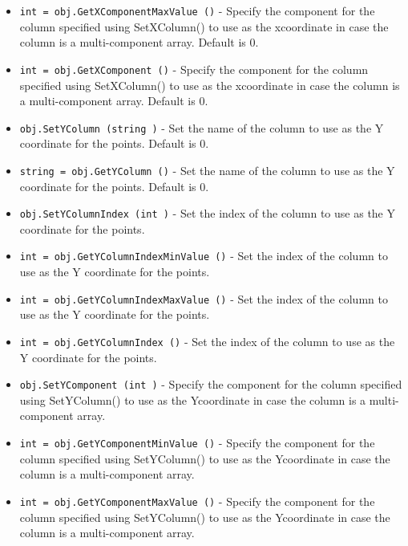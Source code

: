 \begin{itemize}
\item  \verb|int = obj.GetXComponentMaxValue ()| -  Specify the component for the column specified using SetXColumn() to
 use as the xcoordinate in case the column is a multi-component array.
 Default is 0.

\item  \verb|int = obj.GetXComponent ()| -  Specify the component for the column specified using SetXColumn() to
 use as the xcoordinate in case the column is a multi-component array.
 Default is 0.

\item  \verb|obj.SetYColumn (string )| -  Set the name of the column to use as the Y coordinate for the points. 
 Default is 0.

\item  \verb|string = obj.GetYColumn ()| -  Set the name of the column to use as the Y coordinate for the points. 
 Default is 0.

\item  \verb|obj.SetYColumnIndex (int )| -  Set the index of the column to use as the Y coordinate for the points. 

\item  \verb|int = obj.GetYColumnIndexMinValue ()| -  Set the index of the column to use as the Y coordinate for the points. 

\item  \verb|int = obj.GetYColumnIndexMaxValue ()| -  Set the index of the column to use as the Y coordinate for the points. 

\item  \verb|int = obj.GetYColumnIndex ()| -  Set the index of the column to use as the Y coordinate for the points. 

\item  \verb|obj.SetYComponent (int )| -  Specify the component for the column specified using SetYColumn() to
 use as the Ycoordinate in case the column is a multi-component array.

\item  \verb|int = obj.GetYComponentMinValue ()| -  Specify the component for the column specified using SetYColumn() to
 use as the Ycoordinate in case the column is a multi-component array.

\item  \verb|int = obj.GetYComponentMaxValue ()| -  Specify the component for the column specified using SetYColumn() to
 use as the Ycoordinate in case the column is a multi-component array.


\end{itemize}
